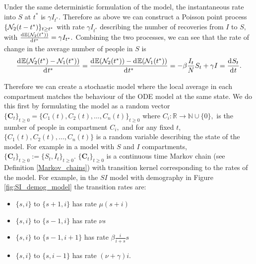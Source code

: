 Under the same deterministic formulation of the model, the instantaneous rate into $S$ at $t^*$ is $\gamma I_{t^*}.$ Therefore as above we can construct a Poisson point process $\{\mathcal{N}_2(t - t^*)\}_{t\geq t^*}$ with rate $\gamma I_{t^*}$ describing the number of recoveries from $I$ to $S,$ with $\frac{\diff \E(\N_2(t^*))}{\diff t^*} = \gamma I_{t^*}.$ Combining the two processes, we can see that the rate of change in the average number of people in $S$ is $$\frac{\diff \E(\N_2(t^*) - \N_1(t^*))}{\diff t^*} = \frac{\diff \E(\N_2(t^*)) - \diff \E(\N_1(t^*))}{\diff t^*} = -\beta \frac{I_t}{N}S_t + \gamma I = \frac{\diff S_t}{\diff t}.$$


Therefore we can create a stochastic model where the local average in each compartment matches the behaviour of the ODE model at the same state. We do this first by formulating the model as a random vector $\{\mathbf{C}_t\}_{t\geq 0} = \{C_1(t), C_2(t), \dots, C_n(t)\}_{t\geq 0}$ where $C_i:\mathbb{R} \to \mathbb{N}\cup\{0\},$ is the number of people in compartment $C_i,$ and for any fixed $t$, $\{C_1(t), C_2(t), \dots, C_n(t)\}$ is a random variable describing the state of the model. For example in a model with $S$ and $I$ compartments, $\{\mathbf{C}_t\}_{t\geq 0}:=\{S_t, I_t\}_{t\geq 0}.$ $\{\mathbf{C}_t\}_{t\geq 0}$ is a continuous time Markov chain (see Definition \ref{Markov_chains}) with transition kernel corresponding to the rates of the model. For example, in the $SI$ model with demography in Figure \ref{fig:SI_demog_model} the transition rates are: \begin{itemize}
    \item $\{s, i\}$ to $\{s + 1, i\}$ has rate $\mu (s + i)$
    \item $\{s, i\}$ to $\{s - 1, i\}$ has rate $\nu s$
    \item $\{s, i\}$ to $\{s - 1, i + 1\}$ has rate $\beta \frac{i}{i+s}s$
    \item $\{s, i\}$ to $\{s, i - 1\}$ has rate $(\nu + \gamma) i.$
\end{itemize}

